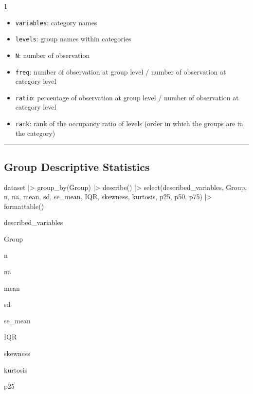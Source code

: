 \documentclass[
  letterpaper,
  DIV=11,
  numbers=noendperiod]{scrreprt}
\newenvironment{Shaded}{\begin{snugshade}}{\end{snugshade}}
\newcommand{\FunctionTok}[1]{\textcolor[rgb]{0.28,0.35,0.67}{#1}}
\newcommand{\NormalTok}[1]{\textcolor[rgb]{0.00,0.23,0.31}{#1}}
\newcommand{\SpecialCharTok}[1]{\textcolor[rgb]{0.37,0.37,0.37}{#1}}
\providecommand{\tightlist}{%
  \setlength{\itemsep}{0pt}\setlength{\parskip}{0pt}}\usepackage{longtable,booktabs,array}
\begin{document}
1

\begin{itemize}
\tightlist
\item
  \texttt{variables}: category names
\item
  \texttt{levels}: group names within categories
\item
  \texttt{N}: number of observation
\item
  \texttt{freq}: number of observation at group level / number of
  observation at category level
\item
  \texttt{ratio}: percentage of observation at group level / number of
  observation at category level
\item
  \texttt{rank}: rank of the occupancy ratio of levels (order in which
  the groups are in the category)
\end{itemize}

\begin{center}\rule{0.5\linewidth}{0.5pt}\end{center}

\hypertarget{group-descriptive-statistics}{%
\subsection{Group Descriptive
Statistics}\label{group-descriptive-statistics}}

\begin{Shaded}
\begin{Highlighting}[]
\NormalTok{dataset }\SpecialCharTok{|\textgreater{}}
  \FunctionTok{group\_by}\NormalTok{(Group) }\SpecialCharTok{|\textgreater{}}
  \FunctionTok{describe}\NormalTok{() }\SpecialCharTok{|\textgreater{}}
  \FunctionTok{select}\NormalTok{(described\_variables, Group, n, na, mean, sd, se\_mean, IQR, skewness, kurtosis, p25, p50, p75) }\SpecialCharTok{|\textgreater{}}
  \FunctionTok{formattable}\NormalTok{()}
\end{Highlighting}
\end{Shaded}

described\_variables

Group

n

na

mean

sd

se\_mean

IQR

skewness

kurtosis

p25
\end{document}
